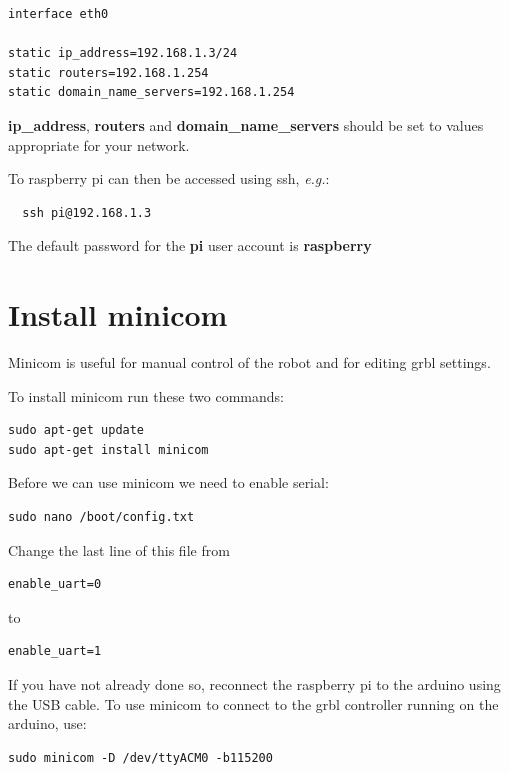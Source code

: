 \documentclass[]{book}
\theoremstyle{definition}
\theoremstyle{definition}
\theoremstyle{definition}
\theoremstyle{remark}
\begin{document}
\begin{verbatim}
interface eth0

static ip_address=192.168.1.3/24
static routers=192.168.1.254
static domain_name_servers=192.168.1.254
\end{verbatim}

\textbf{ip\_address}, \textbf{routers} and
\textbf{domain\_name\_servers} should be set to values appropriate for
your network.

To raspberry pi can then be accessed using ssh, \emph{e.g.}:

\begin{verbatim}
  ssh pi@192.168.1.3
\end{verbatim}

The default password for the \textbf{pi} user account is
\textbf{raspberry}

\section{Install minicom}\label{install-minicom}

Minicom is useful for manual control of the robot and for editing grbl
settings.

To install minicom run these two commands:

\begin{verbatim}
sudo apt-get update
sudo apt-get install minicom
\end{verbatim}

Before we can use minicom we need to enable serial:

\begin{verbatim}
sudo nano /boot/config.txt
\end{verbatim}

Change the last line of this file from

\begin{verbatim}
enable_uart=0
\end{verbatim}

to

\begin{verbatim}
enable_uart=1
\end{verbatim}

If you have not already done so, reconnect the raspberry pi to the
arduino using the USB cable. To use minicom to connect to the grbl
controller running on the arduino, use:

\begin{verbatim}
sudo minicom -D /dev/ttyACM0 -b115200
\end{verbatim}
\end{document}
